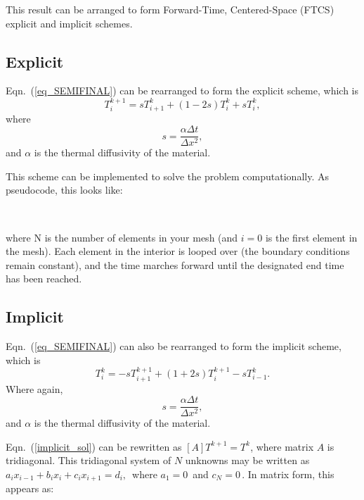 \documentclass[twocolumn,10pt]{asme2ej}
\begin{document}
This result can be arranged to form Forward-Time, Centered-Space (FTCS) explicit and implicit schemes.

\subsection{Explicit}
Eqn.~(\ref{eq_SEMIFINAL}) can be rearranged to form the explicit scheme, which is
\begin{equation}
T_i^{k+1} = sT_{i+1}^k +(1- 2s)T_i^k + sT_{i}^k,
\end{equation}
\noindent where
\begin{equation}
s = \frac{\alpha \Delta t}{\Delta x^2},
\end{equation}
\noindent and $\alpha$ is the thermal diffusivity of the material.

This scheme can be implemented to solve the problem computationally. As pseudocode, this looks like: \\
\begin{algorithmic}
    \EndFor
\EndWhile \\
\end{algorithmic}
\noindent where N is the number of elements in your mesh (and $i = 0$ is the first element in the mesh). Each element in the interior is looped over (the boundary conditions remain constant), and the time marches forward until the designated end time has been reached.

\subsection{Implicit}
Eqn.~(\ref{eq_SEMIFINAL}) can also be rearranged to form the implicit scheme, which is
\begin{equation}
\label{implicit_sol}
T_i^k = -sT_{i+1}^{k+1} +(1+2s)T_i^{k+1} - sT_{i-1}^k.
\end{equation}
\noindent Where again,
\begin{equation}
s = \frac{\alpha \Delta t}{\Delta x^2},
\end{equation}
\noindent and $\alpha$ is the thermal diffusivity of the material.

Eqn.~(\ref{implicit_sol}) can be rewritten as $[A] T^{k+1} = T^k$, where matrix $A$ is tridiagonal. This tridiagonal system of $N$ unknowns may be written as $a_i x_{i - 1}  + b_i x_i  + c_i x_{i + 1}  = d_i , \,\!$ where $ a_1  = 0\, $ and $ c_N = 0\, $. In matrix form, this appears as:
\end{document}
